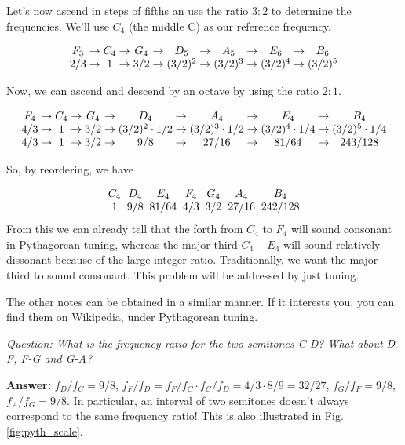 Let's now ascend in steps of fifths an use the ratio $3:2$ to determine the frequencies. We'll use $C_4$ (the middle C) as our reference frequency. 

\[
\begin{array}{c@{\;\rightarrow\;}c@{\;\rightarrow\;}c@{\;\rightarrow\;}c@{\;\rightarrow\;}c@{\;\rightarrow\;}c@{\;\rightarrow\;}c}
F_3 & C_4 & G_4 & D_5 & A_5 & E_6 & B_6 \\
2/3 & 1 & 3/2 & (3/2)^2 & (3/2)^3 & (3/2)^4 & (3/2)^5
\end{array}
\]

Now, we can ascend and descend by an octave by using the ratio $2:1$.

\[
\begin{array}{c@{\;\rightarrow\;}c@{\;\rightarrow\;}c@{\;\rightarrow\;}c@{\;\rightarrow\;}c@{\;\rightarrow\;}c@{\;\rightarrow\;}c}
F_4 & C_4 & G_4 & D_4 & A_4 & E_4 & B_4 \\
4/3 & 1 & 3/2 & (3/2)^2 \cdot 1/2 & (3/2)^3 \cdot 1/2 & (3/2)^4 \cdot 1/4& (3/2)^5  \cdot 1/4 \\
4/3& 1& 3/2 & 9/8 & 27/16 & 81/64 & 243/128
\end{array} \\
\]

So, by reordering, we have 

\[
\begin{array}{c@{\;\;}c@{\;\;}c@{\;\;}c@{\;\;}c@{\;\;}c@{\;\;}c}
C_4 & D_4 & E_4 & F_4 & G_4 & A_4 & B_4 \\
1 & 9/8 & 81/64 & 4/3 & 3/2 & 27/16 & 242/128
\end{array} \\
\]
From this we can already tell that the forth from $C_4$ to $F_4$ will sound consonant in Pythagorean tuning, whereas the major third $C_4 - E_4$ will sound relatively dissonant because of the large integer ratio. Traditionally, we want the major third to sound consonant. This problem will be addressed by just tuning.

The other notes can be obtained in a similar manner. If it interests you, you can find them on Wikipedia, under Pythagorean tuning.

\textit{Question: What is the frequency ratio for the two semitones C-D? What about D-F, F-G and G-A?}

\textbf{Answer:} $f_D/f_C = 9/8$, $f_F/f_D = f_F/f_C \cdot f_C/f_D = 4/3 \cdot 8/9 = 32 / 27$, $f_G/f_F = 9/8$, $f_A/f_G = 9/8$. In particular, an interval of two semitones doesn't always correspond to the same frequency ratio! This is also illustrated in Fig. \ref{fig:pyth_scale}.

